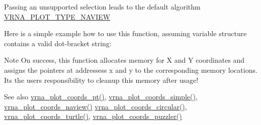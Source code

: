 Passing an unsupported selection leads to the default algorithm \mbox{\hyperlink{group__plot__layout__utils_ga94d4c863ecac2f220f76658afb92f964}{V\+R\+N\+A\+\_\+\+P\+L\+O\+T\+\_\+\+T\+Y\+P\+E\+\_\+\+N\+A\+V\+I\+EW}}

Here is a simple example how to use this function, assuming variable {\ttfamily structure} contains a valid dot-\/bracket string\+: 
\begin{DoxyCode}{0}
\DoxyCodeLine{}
\DoxyCodeLine{\} \textcolor{keywordflow}{else} \{}
\DoxyCodeLine{\}}
\DoxyCodeLine{}
\end{DoxyCode}


\begin{DoxyNote}{Note}
On success, this function allocates memory for X and Y coordinates and assigns the pointers at addressess {\ttfamily x} and {\ttfamily y} to the corresponding memory locations. It\textquotesingle{}s the users responsibility to cleanup this memory after usage!
\end{DoxyNote}
\begin{DoxySeeAlso}{See also}
\mbox{\hyperlink{group__plot__layout__utils_gaccd6a87cb324b7d680e5dd93e112738b}{vrna\+\_\+plot\+\_\+coords\+\_\+pt()}}, \mbox{\hyperlink{group__plot__layout__utils_gaea0dada4d0113d16d4890bc0937292e6}{vrna\+\_\+plot\+\_\+coords\+\_\+simple()}}, \mbox{\hyperlink{group__plot__layout__utils_gac0335e398d01202c77c1d7b28811b761}{vrna\+\_\+plot\+\_\+coords\+\_\+naview()}} \mbox{\hyperlink{group__plot__layout__utils_ga47ff1fd92e9658361a758fdb03122911}{vrna\+\_\+plot\+\_\+coords\+\_\+circular()}}, \mbox{\hyperlink{group__plot__layout__utils_ga195139110e2877b92c7f82d05b6dad19}{vrna\+\_\+plot\+\_\+coords\+\_\+turtle()}}, \mbox{\hyperlink{group__plot__layout__utils_gafd49896df8780c9669125429bc0da9b3}{vrna\+\_\+plot\+\_\+coords\+\_\+puzzler()}}
\end{DoxySeeAlso}

